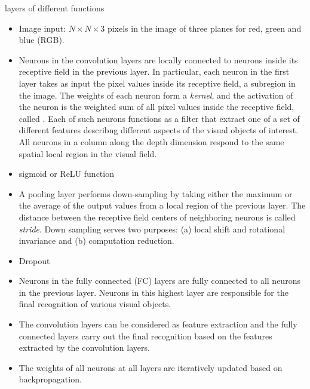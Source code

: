 \documentclass{article}
\begin{document}
layers of different functions 
\begin{itemize}
\item Image input: $N\times N\times 3$ pixels in the image of three planes for 
  red, green and blue (RGB).
\item Neurons in the convolution layers are locally connected to neurons inside 
  its receptive field in the previous layer. In particular, each neuron in the
  first layer takes as input the pixel values inside its receptive field, a 
  subregion in the image. The weights of each neuron form a {\em kernel}, and 
  the activation of the neuron is the weighted sum of all pixel values inside 
  the receptive field, called
  .
  Each of such neurons functions as a filter that extract one of a set of 
  different features describng different aspects of the visual objects of 
  interest. All neurons in a column along the depth dimension respond to the
  same spatial local region in the visual field.
\item sigmoid or ReLU function 
\item A pooling layer performs down-sampling by taking either the maximum or the
  average of the output values from a local region of the previous layer. The
  distance between the receptive field centers of neighboring neurons is called
  {\em stride}. Down sampling serves two purposes: (a) local shift and rotational
  invariance and (b) computation reduction.
\item Dropout
\item Neurons in the fully connected (FC) layers are fully connected to 
  all neurons in the previous layer. Neurons in this highest layer are
  responsible for the final recognition of various visual objects.
\item The convolution layers can be considered as feature extraction and the
  fully connected layers carry out the final recognition based on the features
  extracted by the convolution layers.
\item The weights of all neurons at all layers are iteratively updated based
  on backpropagation.
\end{itemize}




\end{document}

